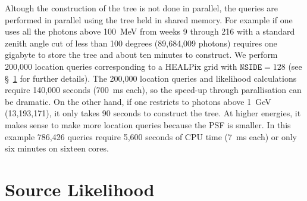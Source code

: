 \documentclass[useAMS,usenatbib]{mn2e}
\begin{document}
Altough the construction of the tree is not done in parallel, the
queries are performed in parallel using the tree held in shared
memory.  For example if one uses all the photons above 100~MeV from
weeks 9 through 216 with a standard zenith angle cut of less than 100
degrees (89,684,009 photons) requires one gigabyte to store the tree
and about ten minutes to construct. We perform 200,000 location
queries corresponding to a HEALPix \citep{2005ApJ...622..759G} grid
with $\mathtt{NSIDE}=128$ (see \S~\ref{sec:source-likelihood} for
further details).  The 200,000 location queries and likelihood
calculations require 140,000 seconds (700~ms each), so the speed-up
through parallisation can be dramatic.  On the other hand, if one
restricts to photons above 1~GeV (13,193,171), it only takes 90
seconds to construct the tree.  At higher energies, it makes sense to
make more location queries because the PSF is smaller.  In this
example 786,426 queries require 5,600 seconds of CPU time (7~ms each)
or only six minutes on sixteen cores.

\section{Source Likelihood}
\label{sec:source-likelihood}
\end{document}
